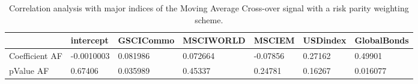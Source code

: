 \begin{table}[H]
\centering
\begin{tabular}{lllllll}
\hline& intercept & GSCICommo & MSCIWORLD & MSCIEM & USDindex & GlobalBonds \\ 
\hline 
Coefficient AF & -0.0010003 & 0.081986 & 0.072664 & -0.07856 & 0.27162 & 0.49901 \\ 
pValue AF & 0.67406 & 0.035989 & 0.45337 & 0.24781 & 0.16267 & 0.016077 \\ 
\hline
\end{tabular}
\caption{Correlation analysis with major indices of the Moving Average Cross-over signal with a risk parity weighting scheme.}
\label{MARP_AFACTOR}
\end{table}